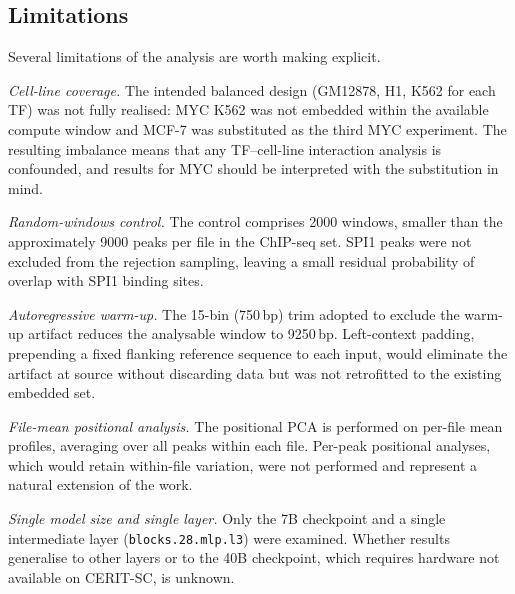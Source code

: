 \documentclass[12pt,a4paper,twoside,final]{book}
\begin{document}
\subsection{Limitations}

Several limitations of the analysis are worth making explicit.

\textit{Cell-line coverage.}
The intended balanced design (GM12878, H1, K562 for each TF) was not fully realised: MYC K562 was not embedded within the available compute window and MCF-7 was substituted as the third MYC experiment. %
The resulting imbalance means that any TF--cell-line interaction analysis is confounded, and results for MYC should be interpreted with the substitution in mind. %

\textit{Random-windows control.}
The control comprises 2000 windows, smaller than the approximately 9000 peaks per file in the ChIP-seq set.
SPI1 peaks were not excluded from the rejection sampling, leaving a small residual probability of overlap with SPI1 binding sites.

\textit{Autoregressive warm-up.}
The 15-bin (750\,bp) trim adopted to exclude the warm-up artifact reduces the analysable window to 9250\,bp.
Left-context padding, prepending a fixed flanking reference sequence to each input, would eliminate the artifact at source without discarding data but was not retrofitted to the existing embedded set. %

\textit{File-mean positional analysis.}
The positional PCA is performed on per-file mean profiles, averaging over all peaks within each file.
Per-peak positional analyses, which would retain within-file variation, were not performed and represent a natural extension of the work. %

\textit{Single model size and single layer.}
Only the 7B checkpoint and a single intermediate layer (\texttt{blocks.28.mlp.l3}) were examined. %
Whether results generalise to other layers or to the 40B checkpoint, which requires hardware not available on CERIT-SC, is unknown. %

\printbibliography
\end{document}
